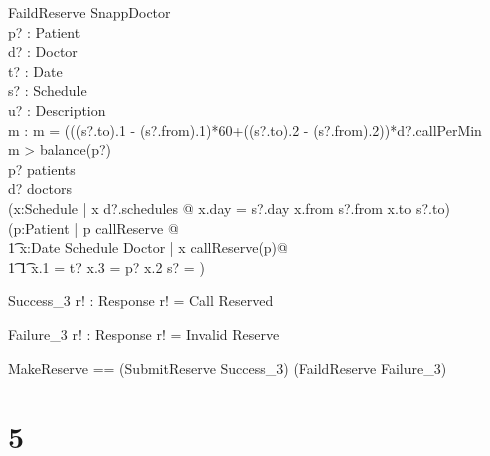 \documentclass{article}
\begin{document}
\begin{schema}{FaildReserve}
\Xi SnappDoctor\\
p? : Patient\\
d? : Doctor\\
t? : Date\\
s? : Schedule\\
u? : Description\\
m : \nat
\where
m = (((s?.to).1 - (s?.from).1)*60+((s?.to).2 - (s?.from).2))*d?.callPerMin \\
m > balance(p?) \lor \\
p? \notin patients \lor \\
d? \notin doctors \lor \\
\neg (\exists x:Schedule | x \in d?.schedules @ x.day = s?.day \land x.from \le s?.from \land x.to \ge s?.to) \lor\\
\neg (\forall p:Patient | p \in callReserve @ \\
\t1 \forall x:Date \cross Schedule \cross Doctor | x \in callReserve(p)@\\
\t1 \t1 x.1 = t? \land x.3 = p? \implies x.2 \cap s? = \emptyset) 
\end{schema}

\begin{schema}{Success_3}
r! : Response
\where
r! = Call Reserved
\end{schema}

\begin{schema}{Failure_3}
r! : Response
\where
r! = Invalid Reserve
\end{schema}

\begin{zed}
MakeReserve == (SubmitReserve \land Success_3) \lor (FaildReserve \land Failure_3)
\end{zed}

\section*{5}
\end{document}
